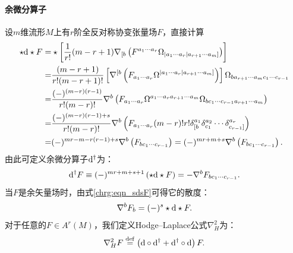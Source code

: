 \paragraph{余微分算子} 
设$m$维流形$M$上有$r$阶全反对称协变张量场$F$，直接计算
\begin{align*}
	\star {\rm d} \star F =& \star \left[\frac{1}{r!} (m-r+1) \nabla_{[b}	\left( 
	F^{a_1 \cdots a_r} \Omega_{|a_1 \cdots a_r| a_{r+1} \cdots a_m]}\right)\right] \\
	=& \frac{(m-r+1)}{r!(m-r+1)!} \left[\nabla^{[b}	\left( 
	F_{a_1 \cdots a_r} \Omega^{|a_1 \cdots a_r| a_{r+1} \cdots a_m]}\right)\right]
	\Omega_{b a_{r+1} \cdots a_m c_{1} \cdots c_{r-1}} \\
	=& \frac{(-)^{(m-r)(r-1)}}{r!(m-r)!} \nabla^{b}	\left( 
	F_{a_1 \cdots a_r} \Omega^{a_1 \cdots a_r a_{r+1} \cdots a_m}
	\Omega_{b c_{1} \cdots c_{r-1} a_{r+1} \cdots a_m } \right) \\
	=& \frac{(-)^{(m-r)(r-1)+s}}{r!(m-r)!} \nabla^{b}	\left(	F_{a_1 \cdots a_r} 	(m-r)! r! 
	\delta_{\lbrack b}^{a_1} \delta_{c_1}^{a_2}\cdots \delta_{c_{r-1} \rbrack}^{a_r}   \right) \\
	=& (-)^{mr - m - r(r-1)+s} \nabla^{b} \left(F_{b c_1 \cdots c_{r-1}} \right)
	= (-)^{mr+m+s} \nabla^{b} \left(F_{b c_1 \cdots c_{r-1}} \right) .
\end{align*}
由此可定义余微分算子${\rm d}^{\dagger}$为：
\begin{equation}\label{chrg:eqn_sdsF}
	{\rm d}^{\dagger} F \equiv (-)^{mr+m+s+1} \left(\star {\rm d} \star F\right) 
	= -\nabla^{b} F_{b c_1 \cdots c_{r-1}} .
\end{equation}
当$F$是余矢量场时，由式\eqref{chrg:eqn_sdsF}可得它的散度：
\begin{equation}
	\nabla^{b} F_{b} = (-)^{s} \star {\rm d} \star F .
\end{equation}
对于任意的$F\in A^r(M)$，我们定义Hodge--Laplace公式$\nabla^2_H$为：
\begin{equation}\label{chrg:eqn_HL}
	\nabla^2_H F \overset{\mathrm {def}}{=}
	\left({\rm d}\circ{\rm d}^{\dagger} +{\rm d}^{\dagger}\circ{\rm d}\right)F.
\end{equation}	


